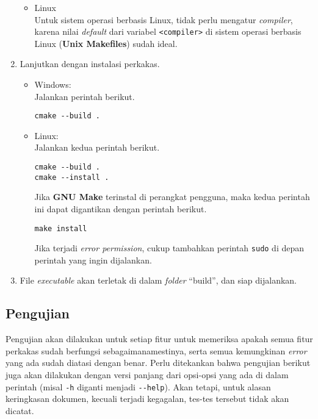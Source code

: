 \begin{enumerate}
\begin{itemize}
		\item Linux \\
		Untuk sistem operasi berbasis Linux, tidak perlu mengatur \textit{compiler}, karena nilai \textit{default} dari variabel \verb|<compiler>| di sistem operasi berbasis Linux (\textbf{Unix Makefiles}) sudah ideal.
	\end{itemize}
	\newpage\vspace*{-1.5em} %
	\item Lanjutkan dengan instalasi perkakas.
	
	\begin{itemize}
		\item Windows: \\
			Jalankan perintah berikut.
			\begin{verbatim}
cmake --build .
			\end{verbatim}
		\item Linux: \\
		Jalankan kedua perintah berikut.
			\begin{verbatim}
cmake --build .
cmake --install .
			\end{verbatim}
		Jika \textbf{GNU Make} terinstal di perangkat pengguna, maka kedua perintah ini dapat digantikan dengan perintah berikut.
		\begin{verbatim}
make install
		\end{verbatim}
		Jika terjadi \textit{error permission}, cukup tambahkan perintah \verb|sudo| di depan perintah yang ingin dijalankan.
	\end{itemize}
	
	\item File \textit{executable} akan terletak di dalam \textit{folder} ``build'', dan siap dijalankan.
\end{enumerate}
\vspace*{-0.5em} %
\subsection{Pengujian}
\label{sec:testing-experiments-testing}

Pengujian akan dilakukan untuk setiap fitur untuk memeriksa apakah semua fitur perkakas sudah berfungsi sebagaimanamestinya, serta semua kemungkinan \textit{error} yang ada sudah diatasi dengan benar. Perlu ditekankan bahwa pengujian berikut juga akan dilakukan dengan versi panjang dari opsi-opsi yang ada di dalam perintah (misal \verb|-h| diganti menjadi \verb|--help|). Akan tetapi, untuk alasan keringkasan dokumen, kecuali terjadi kegagalan, tes-tes tersebut tidak akan dicatat.

